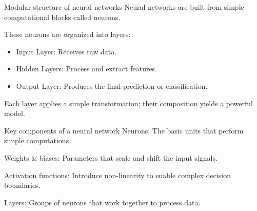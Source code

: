 \documentclass[xcolor=x11names,compress,10pt,unknownkeysallowed,aspectratio=169]{beamer}
\begin{document}
%
\begin{frame}{Modular structure of neural networks}
Neural networks are built from simple computational blocks called \alert{neurons}.

\vspace{0.6cm}
These neurons are organized into layers:
\vspace{0.1cm}
\begin{itemize}
    \item \alert{Input Layer:} Receives raw data.
    
    \vspace{0.3cm}
    \item \alert{Hidden Layers:} Process and extract features.

    \vspace{0.3cm}
    \item \alert{Output Layer:} Produces the final prediction or classification.
\end{itemize}

\vspace{0.6cm}
Each layer applies a \alert{simple transformation}; their composition yields a powerful model.

  
\end{frame}
%
\begin{frame}{Key components of a neural network}
\alert{Neurons:} The basic units that perform simple computations.

\vspace{0.8cm}
\alert{Weights \& biases:} Parameters that scale and shift the input signals.

\vspace{0.8cm}
\alert{Activation functions:} Introduce non-linearity to enable complex decision boundaries.

\vspace{0.8cm}
\alert{Layers:} Groups of neurons that work together to process data.
  
\end{frame}
%
\end{document}
